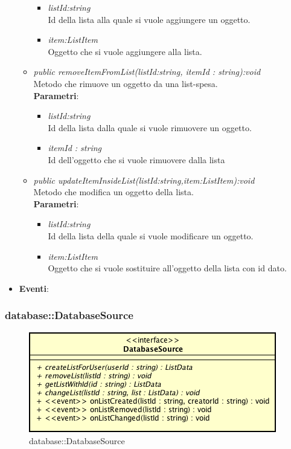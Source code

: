 \begin{itemize}
\begin{itemize}
\begin{itemize}
			\item \textit{listId:string}\\
			Id della lista alla quale si vuole aggiungere un oggetto.
			\item \textit{item:ListItem}\\
			Oggetto che si vuole aggiungere alla lista.
			\end{itemize} 
	\item \textit{public removeItemFromList(listId:string, itemId : string):void}\\
	Metodo che rimuove un oggetto da una list-spesa.
			\\ \textbf{Parametri}: \begin{itemize}
			\item \textit{listId:string}\\
			Id della lista dalla quale si vuole rimuovere un oggetto.
			\item \textit{itemId : string} \\
			Id dell'oggetto che si vuole rimuovere dalla lista
			\end{itemize} 
	\item \textit{public updateItemInsideList(listId:string,item:ListItem):void}\\
	Metodo che modifica un oggetto della lista.
			\\ \textbf{Parametri}: \begin{itemize}
			\item \textit{listId:string}\\
			Id della lista della quale si vuole modificare un oggetto.
			\item \textit{item:ListItem}\\
			Oggetto che si vuole sostituire all'oggetto della lista con id dato.
			\end{itemize} 
	\end{itemize}
\item \textbf{Eventi}:
\end{itemize}

\subsubsection{database::DatabaseSource}

\label{database::DatabaseSource}
\begin{figure}[H]
	\centering
	\includegraphics[scale=0.5]{Sezioni/SottosezioniST/img/app/DatabaseSource.png}
	\caption{database::DatabaseSource}
\end{figure}


